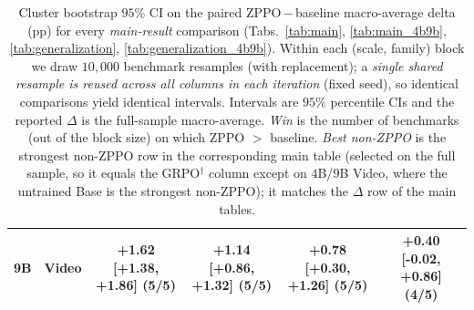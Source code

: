 \documentclass{llmxive}
\begin{document}
\begin{table}[!htbp]
{\begin{tabular}{llcccc}
        9B & Video & +1.62 [+1.38, +1.86] (5/5) & +1.14 [+0.86, +1.32] (5/5) & +0.78 [+0.30, +1.26] (5/5) & +0.40 [-0.02, +0.86] (4/5) \\
        \bottomrule
    \end{tabular}%
    }
    \caption{Cluster bootstrap $95\%$ CI on the paired ZPPO\,$-$\,baseline macro-average delta (pp) for every \emph{main-result} comparison (Tabs.~\ref{tab:main}, \ref{tab:main_4b9b}, \ref{tab:generalization}, \ref{tab:generalization_4b9b}). Within each (scale, family) block we draw $10{,}000$ benchmark resamples (with replacement); a \emph{single shared resample is reused across all columns in each iteration} (fixed seed), so identical comparisons yield identical intervals. Intervals are $95\%$ percentile CIs and the reported $\Delta$ is the full-sample macro-average. \emph{Win} is the number of benchmarks (out of the block size) on which ZPPO $>$ baseline. \emph{Best non-ZPPO} is the strongest non-ZPPO row in the corresponding main table (selected on the full sample, so it equals the GRPO$^{\dagger}$ column except on $4$B/$9$B Video, where the untrained Base is the strongest non-ZPPO); it matches the $\Delta$ row of the main tables.}
    \label{tab:appendix:ci_main}
\end{table}
\end{document}
